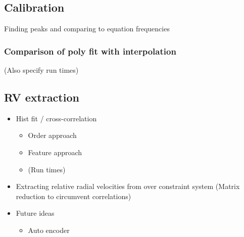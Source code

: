 \subsection{Calibration}
    Finding peaks and comparing to equation frequencies
    \subsubsection{Comparison of poly fit with interpolation}
        (Also specify run times)

\subsection{RV extraction}
    \begin{itemize}
        \item Hist fit / cross-correlation
        \begin{itemize}
            \item Order approach
            \item Feature approach
            \item (Run times)
        \end{itemize}
        \item Extracting relative radial velocities from over constraint system (Matrix reduction to circumvent correlations)
        \item Future ideas
        \begin{itemize}
            \item Auto encoder
        \end{itemize}
    \end{itemize}
